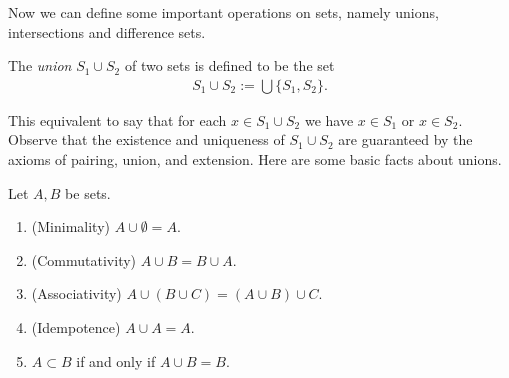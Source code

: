 \begin{comment}
If $A$ is a set which elements are sets, we usually call it a \emph{collection} instead of a set. By the axiom of union, for every collection $A$ there exists a set $U$ such that if $x \in S$ for some $S \in A$, then $x \in U$. We can apply the axiom of specification to form the set
    \begin{align*}
        \{x \in U : x \in S \text{ for some } S \in A\},
    \end{align*}
note that the axiom of extension guarantees its uniqueness.
\end{comment}

Now we can define some important operations on sets, namely unions, intersections and difference sets.
\begin{comment}
The \emph{unions} $S_1 \cup S_2$ of two sets is defined to be
    \begin{align*}
        S_1 \cup S_2 := \bigcup\{S_1, S_2\}.
    \end{align*}
This equivalent to say that for each $x \in S_1 \cup S_2$ we have $x \in S_1$ or $x \in S_2$. Observe that the existence and uniqueness of $S_1 \cup S_2$ are guaranteed by the axioms of pairing, union, and extension.
\end{comment}

\begin{definition}[Unions]
    The \emph{union} $S_1 \cup S_2$ of two sets is defined to be the set
    \begin{align*}
        S_1 \cup S_2 := \bigcup\{S_1, S_2\}.
    \end{align*}
\end{definition}
This equivalent to say that for each $x \in S_1 \cup S_2$ we have $x \in S_1$ or $x \in S_2$. Observe that the existence and uniqueness of $S_1 \cup S_2$ are guaranteed by the axioms of pairing, union, and extension. Here are some basic facts about unions.

\begin{proposition}
    Let $A, B$ be sets.
    \begin{enumerate}
        \item (Minimality) $A \cup \emptyset = A$.
        \item (Commutativity) $A \cup B = B \cup A$.
        \item (Associativity) $A \cup (B \cup C) = (A \cup B) \cup C$.
        \item (Idempotence) $A \cup A = A$.
        \item $A \subset B$ if and only if $A \cup B = B$.
    \end{enumerate}
\end{proposition}

